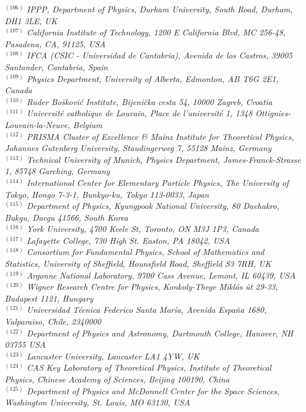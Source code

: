 {\begin{center}
$^{(106)}$ \emph{IPPP, Department of Physics, Durham University, South Road, Durham, DH1 3LE, UK}\\
$^{(107)}$ \emph{California Institute of Technology, 1200 E California Blvd, MC 256-48, Pasadena, CA, 91125, USA}\\
$^{(108)}$ \emph{IFCA (CSIC - Universidad de Cantabria), Avenida de los Castros, 39005 Santander, Cantabria, Spain}\\
$^{(109)}$ \emph{Physics Department, University of Alberta, Edmonton,  AB T6G 2E1, Canada}\\
$^{(110)}$ \emph{Ruder Bo\u skovi\'c Institute, Bijeni\u cka cesta 54, 10000 Zagreb, Croatia}\\
$^{(111)}$ \emph{Universit\'e catholique de Louvain, Place de l'universit\'e 1, 1348 Ottignies-Louvain-la-Neuve, Belgium}\\
$^{(112)}$ \emph{PRISMA Cluster of Excellence \& Mainz Institute for Theoretical Physics, Johannes Gutenberg University, Staudingerweg 7,  55128 Mainz, Germany}\\
$^{(113)}$ \emph{Technical University of Munich, Physics Department, James-Franck-Strasse 1, 85748 Garching, Germany}\\
$^{(114)}$ \emph{International Center for Elementary Particle Physics, The University of Tokyo, Hongo 7-3-1, Bunkyo-ku, Tokyo 113-0033, Japan}\\
$^{(115)}$ \emph{Department of Physics, Kyungpook National University,  80 Daehakro, Bukgu, Daegu 41566, South Korea}\\
$^{(116)}$ \emph{York University, 4700 Keele St, Toronto, ON M3J 1P3, Canada }\\
$^{(117)}$ \emph{Lafayette College, 730 High St. Easton, PA 18042, USA}\\
$^{(118)}$ \emph{Consortium for Fundamental Physics, School of Mathematics and Statistics, University of Sheffield, Hounsfield Road, Sheffield S3 7RH, UK}\\
$^{(119)}$ \emph{Argonne National Laboratory, 9700 Cass Avenue, Lemont, IL 60439, USA}\\
$^{(120)}$ \emph{Wigner Research Centre for Physics, Konkoly-Thege Mikl\'os \'ut 29-33, Budapest 1121, Hungary}\\
$^{(121)}$ \emph{Universidad T\'ecnica Federico Santa Mar\'ia, Avenida Espa\~na 1680, Valparaiso, Chile, 2340000}\\
$^{(122)}$ \emph{Department of Physics and Astronomy, Dartmouth College, Hanover, NH 03755 USA}\\
$^{(123)}$ \emph{Lancaster University, Lancaster LA1 4YW, UK}\\
$^{(124)}$ \emph{CAS Key Laboratory of Theoretical Physics, Institute of Theoretical Physics, Chinese Academy of Sciences, Beijing 100190, China}\\
$^{(125)}$ \emph{Department of Physics and McDonnell Center for the Space Sciences, Washington University, St. Louis, MO 63130, USA}\\



\end{center}}
